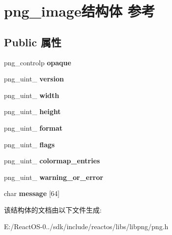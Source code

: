 \hypertarget{structpng__image}{}\section{png\+\_\+image结构体 参考}
\label{structpng__image}
\subsection*{Public 属性}
\begin{DoxyCompactItemize}
\item 
\mbox{\label{structpng__image_a7b502596648744e2ee0c8788e2c6e918}} 
png\+\_\+controlp {\bfseries opaque}
\item 
\mbox{\label{structpng__image_a8c276ba2922051ff0ff9175ab1e23ed1}} 
png\+\_\+uint\+\_ {\bfseries version}
\item 
\mbox{\label{structpng__image_a72ec07853c82c632c2d7b3c68c62b659}} 
png\+\_\+uint\+\_ {\bfseries width}
\item 
\mbox{\label{structpng__image_aaf3cb3eb97ee0938a5e870a96fd1fa48}} 
png\+\_\+uint\+\_ {\bfseries height}
\item 
\mbox{\label{structpng__image_a8a7469310ce4682932b0bc94624f35d1}} 
png\+\_\+uint\+\_ {\bfseries format}
\item 
\mbox{\label{structpng__image_ab9519ecd9acf79b507dad566cc3b379f}} 
png\+\_\+uint\+\_ {\bfseries flags}
\item 
\mbox{\label{structpng__image_a48bf1c6518f03da900f41cd9aa5ae5b7}} 
png\+\_\+uint\+\_ {\bfseries colormap\+\_\+entries}
\item 
\mbox{\label{structpng__image_a1b6e296964e81414b0a1cf232ffbcfce}} 
png\+\_\+uint\+\_ {\bfseries warning\+\_\+or\+\_\+error}
\item 
\mbox{\label{structpng__image_a36b2fdbf312f7b8e025d3c224a746130}} 
char {\bfseries message} \mbox{[}64\mbox{]}
\end{DoxyCompactItemize}


该结构体的文档由以下文件生成\+:\begin{DoxyCompactItemize}
\item 
E\+:/\+React\+O\+S-\/0../sdk/include/reactos/libs/libpng/png.\+h\end{DoxyCompactItemize}

